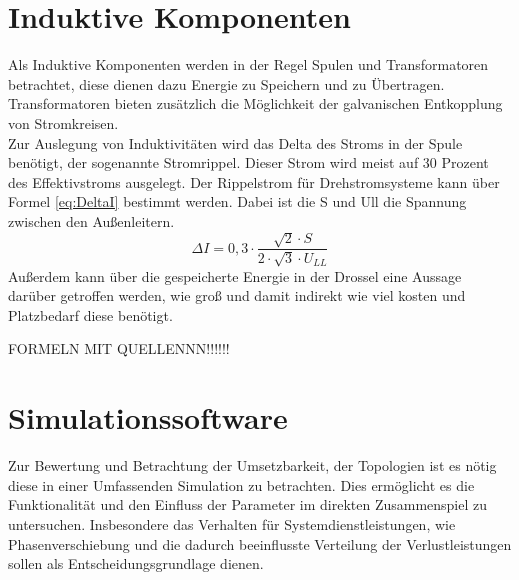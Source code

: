 \section{Induktive Komponenten}
Als Induktive Komponenten werden in der Regel Spulen und Transformatoren betrachtet, diese dienen dazu Energie zu Speichern und zu Übertragen. Transformatoren bieten zusätzlich die Möglichkeit der galvanischen Entkopplung von Stromkreisen.\\ 
Zur Auslegung von Induktivitäten wird das Delta des Stroms in der Spule benötigt, der sogenannte Stromrippel. Dieser Strom wird meist auf 30 Prozent des Effektivstroms ausgelegt. Der Rippelstrom für Drehstromsysteme kann über Formel \ref{eq:DeltaI} bestimmt werden. Dabei ist die \gls{S} und \gls{Ull} die Spannung zwischen den Außenleitern.\\
\begin{equation}
	\label{eq:DeltaI}
	 \Delta I = 0,3 \cdot \dfrac{\sqrt{2} \cdot S}{2 \cdot \sqrt{3} \cdot U_{LL}}
\end{equation}
Außerdem kann über die gespeicherte Energie in der Drossel eine Aussage darüber getroffen werden, wie groß und damit indirekt wie viel kosten und Platzbedarf diese benötigt.

FORMELN MIT QUELLENNN!!!!!!



\section{Simulationssoftware}
Zur Bewertung und Betrachtung der Umsetzbarkeit, der Topologien ist es nötig diese in einer Umfassenden Simulation zu betrachten. Dies ermöglicht es die Funktionalität und den Einfluss der Parameter im direkten Zusammenspiel zu untersuchen. Insbesondere das Verhalten für Systemdienstleistungen, wie Phasenverschiebung und die dadurch beeinflusste Verteilung der Verlustleistungen sollen als Entscheidungsgrundlage dienen. 

